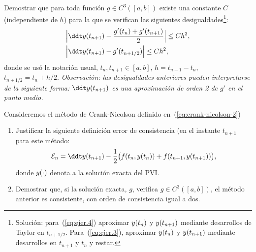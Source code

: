 \begin{EjerciciosPropuestos}
  \begin{problema}
    Demostrar que para toda función $g\in C^3([a,b])$ existe una
    constante $C$ (independiente de $h$) para la que se verifican las
    siguientes desigualdades\footnote{Solución: para~(\ref{eq:ejer.4}) aproximar
      $y(t_{n})$ y $y(t_{n+1})$ mediante desarrollos de Taylor en
      $t_{n+1/2}$. Para~(\ref{eq:ejer.3}), aproximar $y(t_n)$ y
      $y(t_{n+1})$ mediante desarrollos en $t_{n+1}$ y $t_n$ y
      restar.}:
    \begin{align}
      \label{eq:ejer.3}
      \Big| \ddt \sol(t_{n+1}) &- \frac{g'(t_{n})+ g'(t_{n+1})}2 \Big| \le C h^2,
      \\
      \Big| \ddt \sol(t_{n+1}) &- g'(t_{n+1/2}) \Big| \le C h^2,
      \label{eq:ejer.4}
    \end{align}
    donde se usó la notación usual, $t_n, t_{n+1}\in [a,b]$,
    $h=t_{n+1}-t_n$, $t_{n+1/2}=t_{n}+h/2$.  \textit{Observación: las
      desigualdades anteriores pueden interpretarse de la siguiente
      forma: $\ddt \sol(t_{n+1})$ es una aproximación de orden 2 de $g'$
      en el punto medio.}
  \end{problema}

  \begin{problema}
    Consideremos el método de Crank-Nicolson definido en~(\ref{eq:crank-nicolson-2})
    \begin{enumerate}
    \item Justificar la siguiente definición error de consistencia (en
      el instante $t_{n+1}$ para este método:
      \begin{equation*}
        \errCons_n = \ddt \sol(t_{n+1}) - \frac 12 \big( f(t_n, \sol(t_n)) + f(t_{n+1},\sol(t_{n+1}))\big),
      \end{equation*}
      donde $y(\cdot)$ denota a la solución exacta del PVI.
    \item Demostrar que, si la solución exacta, $g$, verifica
      $g\in C^3([a,b])$, el método anterior es consistente, con orden
      de consistencia igual a dos.
    \end{enumerate}
  \end{problema}


\end{EjerciciosPropuestos}
